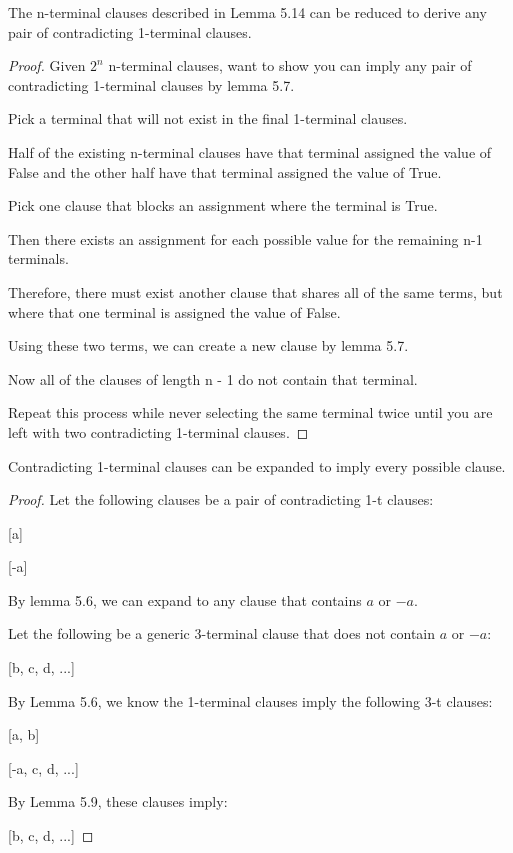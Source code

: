\documentclass[manuscript]{acmart}
\begin{document}
    \begin{lemma}
        The n-terminal clauses described in Lemma 5.14 can be reduced to derive
        any pair of contradicting 1-terminal clauses.
    \end{lemma}
    \begin{proof}
        Given $2^n$ n-terminal clauses, want to show you can imply any pair
        of contradicting 1-terminal clauses by lemma 5.7.

        Pick a terminal that will not exist in the final 1-terminal clauses.

        Half of the existing n-terminal clauses have that terminal assigned
        the value of False and the other half have that terminal assigned
        the value of True.

        Pick one clause that blocks an assignment where the terminal is True.

        Then there exists an assignment for each possible
        value for the remaining n-1 terminals.

        Therefore, there must exist another clause that shares all of the same terms, but
        where that one terminal is assigned the value of False.

        Using these two terms, we can create a new clause by lemma 5.7.

        Now all of the clauses of length n - 1 do not contain that terminal.

        Repeat this process while never selecting the same terminal twice
        until you are left with two contradicting 1-terminal clauses.
    \end{proof}

    \begin{lemma}
        Contradicting 1-terminal clauses can be expanded to imply
        every possible clause.
    \end{lemma}
    \begin{proof}
        Let the following clauses be a pair of contradicting 1-t clauses:

        [a]

        [-a]

        By lemma 5.6, we can expand to any clause that contains $a$ or $-a$.

        Let the following be a generic 3-terminal clause that does not contain
        $a$ or $-a$:

        [b, c, d, ...]

        By Lemma 5.6, we know the 1-terminal clauses imply the following 3-t clauses:

        [a, b]

        [-a, c, d, ...]

        By Lemma 5.9, these clauses imply:

        [b, c, d, ...]
    \end{proof}
\end{document}
